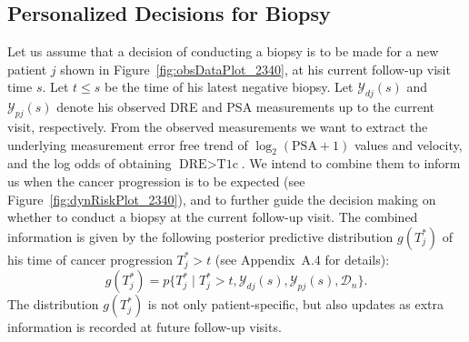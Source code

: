 
\subsection{Personalized Decisions for Biopsy}
\label{subsec:pers_decision_making}
Let us assume that a decision of conducting a biopsy is to be made for a new patient $j$ shown in Figure~\ref{fig:obsDataPlot_2340}, at his current follow-up visit time $s$. Let $t\leq s$ be the time of his latest negative biopsy. Let $\mathcal{Y}_{dj}(s)$ and $\mathcal{Y}_{pj}(s)$ denote his observed DRE and PSA measurements up to the current visit, respectively. From the observed measurements we want to extract the underlying measurement error free trend of $\log_2 (\mbox{PSA} + 1)$ values and velocity, and the log odds of obtaining $\mbox{DRE} > \mbox{T1c}$. We intend to combine them to inform us when the cancer progression is to be expected (see Figure~\ref{fig:dynRiskPlot_2340}), and to further guide the decision making on whether to conduct a biopsy at the current follow-up visit. The combined information is given by the following posterior predictive distribution $g(T^*_j)$ of his time of cancer progression $T^*_j > t$ (see Appendix~A.4 for details):
\begin{equation}
\label{eq:post_pred_dist}
g(T^*_j) = p\big\{T^*_j \mid T^*_j > t, \mathcal{Y}_{dj}(s), \mathcal{Y}_{pj}(s), \mathcal{D}_n\big\}.
\end{equation}
The distribution $g(T^*_j)$ is not only patient-specific, but also updates as extra information is recorded at future follow-up visits.

